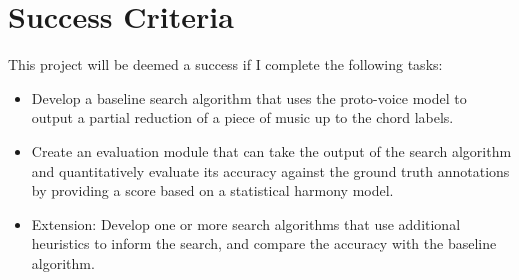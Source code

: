 \documentclass{article}
\begin{document}
\section{Success Criteria}

This project will be deemed a success if I complete the following tasks:
\begin{itemize}
  \item Develop a baseline search algorithm that uses the proto-voice model to output a partial reduction of a piece of music up to the chord labels. 
  \item Create an evaluation module that can take the output of the search algorithm and quantitatively evaluate its accuracy against the ground truth annotations by providing a score based on a statistical harmony model. 
  \item Extension: Develop one or more search algorithms that use additional heuristics to inform the search, and compare the accuracy with the baseline algorithm.
\end{itemize}
\end{document}
